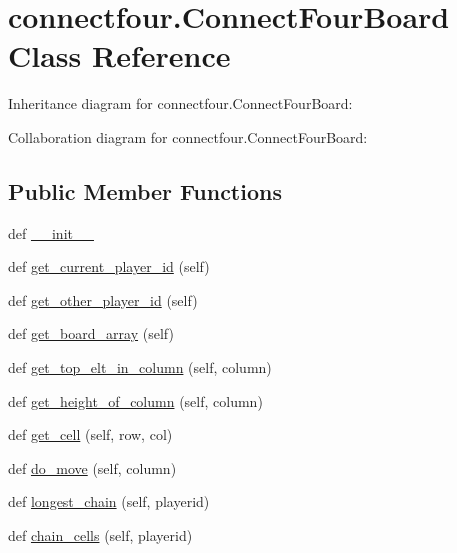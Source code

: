 \hypertarget{classconnectfour_1_1_connect_four_board}{}\section{connectfour.\+Connect\+Four\+Board Class Reference}
\label{classconnectfour_1_1_connect_four_board}


Inheritance diagram for connectfour.\+Connect\+Four\+Board\+:


Collaboration diagram for connectfour.\+Connect\+Four\+Board\+:
\subsection*{Public Member Functions}
\begin{DoxyCompactItemize}
\item 
def \hyperlink{classconnectfour_1_1_connect_four_board_a9039d2f294b916f2c5139807e4aa1cb3}{\+\_\+\+\_\+init\+\_\+\+\_\+}
\item 
def \hyperlink{classconnectfour_1_1_connect_four_board_abedfbd3308b4918066fc4872a702ae8a}{get\+\_\+current\+\_\+player\+\_\+id} (self)
\item 
def \hyperlink{classconnectfour_1_1_connect_four_board_a2698eb546bb597244cfee4b139f9da0c}{get\+\_\+other\+\_\+player\+\_\+id} (self)
\item 
def \hyperlink{classconnectfour_1_1_connect_four_board_a644165386835760d4a4c5ca79664c985}{get\+\_\+board\+\_\+array} (self)
\item 
def \hyperlink{classconnectfour_1_1_connect_four_board_a4e25091c15ebbf727d77c6d7d42498b2}{get\+\_\+top\+\_\+elt\+\_\+in\+\_\+column} (self, column)
\item 
def \hyperlink{classconnectfour_1_1_connect_four_board_a4d0e7514308bb16b206a6cb156a831e4}{get\+\_\+height\+\_\+of\+\_\+column} (self, column)
\item 
def \hyperlink{classconnectfour_1_1_connect_four_board_a088fda69e8c13c1e938cb4e138bb396d}{get\+\_\+cell} (self, row, col)
\item 
def \hyperlink{classconnectfour_1_1_connect_four_board_af8352dbf6f205a0ddfb6c642a166b43e}{do\+\_\+move} (self, column)
\item 
def \hyperlink{classconnectfour_1_1_connect_four_board_aae7f90bbc3ec64b4f8b6edb60584eaf9}{longest\+\_\+chain} (self, playerid)
\item 
def \hyperlink{classconnectfour_1_1_connect_four_board_a7a56b29249ef3d6270da98bf0676e046}{chain\+\_\+cells} (self, playerid)

\end{DoxyCompactItemize}
